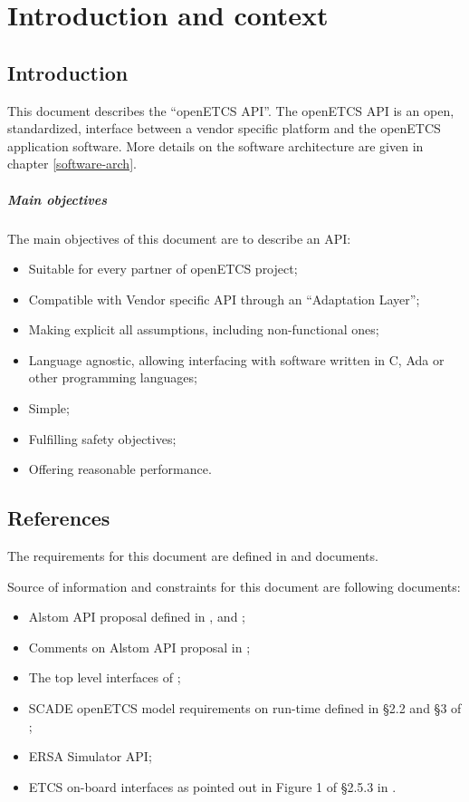 \chapter{Introduction and context}

\section{Introduction}

This document describes the ``openETCS API''. The openETCS API is an
open, standardized, interface between a vendor specific platform and
the openETCS application software. More details on the software
architecture are given in chapter \ref{software-arch}.

\paragraph{Main objectives} The main objectives of this document are
to describe an API:
\begin{itemize}
\item Suitable for every partner of openETCS project;
\item Compatible with Vendor specific API through an ``Adaptation Layer'';
\item Making explicit all assumptions, including non-functional ones;
\item Language agnostic, allowing interfacing with software written
  in C, Ada or other programming languages;
\item Simple;
\item Fulfilling safety objectives;
\item Offering reasonable performance.
\end{itemize}


\section{References}

The requirements for this document are defined in \cite[§7.1]{D2.6-9} and
\cite{API-req-2} documents.

Source of information and constraints for this document are following
documents:
\begin{itemize}
\item Alstom API proposal defined in \cite{alstom-api},
  \cite{alstom-api-app-layer} and \cite{alstom-api-data-dict};
\item Comments on Alstom API proposal in \cite{alstom-api-comments};
\item The top level interfaces of \cite{sysml-model};
\item SCADE openETCS model requirements on run-time defined in §2.2
  and §3 of \cite{scade-modelling-guide};
\item ERSA Simulator API\cite{ERSA-api};
\item ETCS on-board interfaces as pointed out in Figure 1 of §2.5.3 in
  \cite{subset-026}.
\end{itemize}



